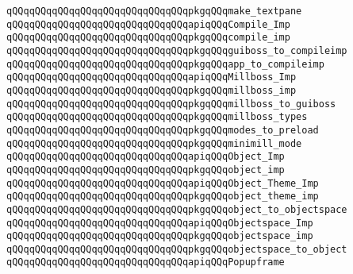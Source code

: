 \verb|qQQqqQQqqQQqqQQqqQQqqQQqqQQqqQQqpkgqQQqmake_textpane|\newline
\newline
\verb|qQQqqQQqqQQqqQQqqQQqqQQqqQQqqQQqapiqQQqCompile_Imp|\newline
\verb|qQQqqQQqqQQqqQQqqQQqqQQqqQQqqQQqpkgqQQqcompile_imp|\newline
\verb|qQQqqQQqqQQqqQQqqQQqqQQqqQQqqQQqpkgqQQqguiboss_to_compileimp|\newline
\verb|qQQqqQQqqQQqqQQqqQQqqQQqqQQqqQQqpkgqQQqapp_to_compileimp|\newline
\newline
\verb|qQQqqQQqqQQqqQQqqQQqqQQqqQQqqQQqapiqQQqMillboss_Imp|\newline
\verb|qQQqqQQqqQQqqQQqqQQqqQQqqQQqqQQqpkgqQQqmillboss_imp|\newline
\verb|qQQqqQQqqQQqqQQqqQQqqQQqqQQqqQQqpkgqQQqmillboss_to_guiboss|\newline
\verb|qQQqqQQqqQQqqQQqqQQqqQQqqQQqqQQqpkgqQQqmillboss_types|\newline
\newline
\verb|qQQqqQQqqQQqqQQqqQQqqQQqqQQqqQQqpkgqQQqmodes_to_preload|\newline
\verb|qQQqqQQqqQQqqQQqqQQqqQQqqQQqqQQqpkgqQQqminimill_mode|\newline
\newline
\verb|qQQqqQQqqQQqqQQqqQQqqQQqqQQqqQQqapiqQQqObject_Imp|\newline
\verb|qQQqqQQqqQQqqQQqqQQqqQQqqQQqqQQqpkgqQQqobject_imp|\newline
\newline
\verb|qQQqqQQqqQQqqQQqqQQqqQQqqQQqqQQqapiqQQqObject_Theme_Imp|\newline
\verb|qQQqqQQqqQQqqQQqqQQqqQQqqQQqqQQqpkgqQQqobject_theme_imp|\newline
\newline
\verb|qQQqqQQqqQQqqQQqqQQqqQQqqQQqqQQqpkgqQQqobject_to_objectspace|\newline
\newline
\verb|qQQqqQQqqQQqqQQqqQQqqQQqqQQqqQQqapiqQQqObjectspace_Imp|\newline
\verb|qQQqqQQqqQQqqQQqqQQqqQQqqQQqqQQqpkgqQQqobjectspace_imp|\newline
\newline
\verb|qQQqqQQqqQQqqQQqqQQqqQQqqQQqqQQqpkgqQQqobjectspace_to_object|\newline
\newline
\verb|qQQqqQQqqQQqqQQqqQQqqQQqqQQqqQQqapiqQQqPopupframe|\newline
